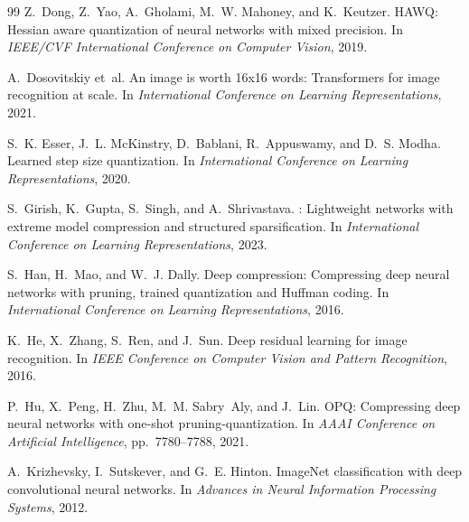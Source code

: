 \documentclass{article}
\begin{document}
{\begin{thebibliography}{99}
Z.~Dong, Z.~Yao, A.~Gholami, M.~W. Mahoney, and K.~Keutzer.
\newblock HAWQ: Hessian aware quantization of neural networks with mixed precision.
\newblock In \emph{IEEE/CVF International Conference on Computer Vision}, 2019.

A.~Dosovitskiy et~al.
\newblock An image is worth 16x16 words: Transformers for image recognition at
  scale.
\newblock In \emph{International Conference on Learning Representations}, 2021.

S.~K. Esser, J.~L. McKinstry, D.~Bablani, R.~Appuswamy, and D.~S. Modha.
\newblock Learned step size quantization.
\newblock In \emph{International Conference on Learning Representations}, 2020.

S.~Girish, K.~Gupta, S.~Singh, and A.~Shrivastava.
: Lightweight networks with extreme model compression and
  structured sparsification.
\newblock In \emph{International Conference on Learning Representations}, 2023.

S.~Han, H.~Mao, and W.~J. Dally.
\newblock Deep compression: Compressing deep neural networks with pruning,
trained quantization and Huffman coding.
\newblock In \emph{International Conference on Learning Representations}, 2016.

K.~He, X.~Zhang, S.~Ren, and J.~Sun.
\newblock Deep residual learning for image recognition.
\newblock In \emph{IEEE Conference on Computer Vision and Pattern Recognition},
  2016.

P.~Hu, X.~Peng, H.~Zhu, M.~M. Sabry~Aly, and J.~Lin.
\newblock OPQ: Compressing deep neural networks with one-shot
pruning-quantization.
\newblock In \emph{AAAI Conference on Artificial Intelligence}, pp.\ 7780--7788,
  2021.

A.~Krizhevsky, I.~Sutskever, and G.~E. Hinton.
\newblock ImageNet classification with deep convolutional neural networks.
\newblock In \emph{Advances in Neural Information Processing Systems}, 2012.


\end{thebibliography}}
\end{document}
